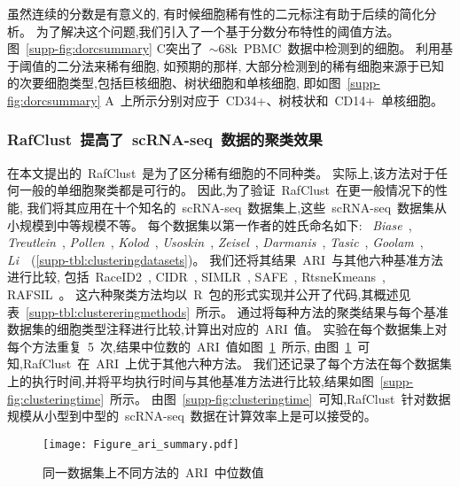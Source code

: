 虽然连续的分数是有意义的,
有时候细胞稀有性的二元标注有助于后续的简化分析。
为了解决这个问题,我们引入了一个基于分数分布特性的阈值方法。
图~\ref{supp-fig:dorcsummary} C突出了~${\sim}68$k~PBMC~数据中检测到的细胞。
利用基于阈值的二分法来稀有细胞,
如预期的那样,
大部分检测到的稀有细胞来源于已知的次要细胞类型,包括巨核细胞、树状细胞和单核细胞,
即如图~\ref{supp-fig:dorcsummary} A~上所示分别对应于~CD34+、树枝状和~CD14+~单核细胞。

\subsubsection{RafClust~提高了~scRNA-seq~数据的聚类效果}

在本文提出的~RafClust~是为了区分稀有细胞的不同种类。
实际上,该方法对于任何一般的单细胞聚类都是可行的。
因此,为了验证~RafClust~在更一般情况下的性能,
我们将其应用在十个知名的~scRNA-seq~数据集上,这些~scRNA-seq~数据集从小规模到中等规模不等。
每个数据集以第一作者的姓氏命名如下: 
~\textit{Biase}~\cite{biase2014cell},
\textit{Treutlein}~\cite{treutlein2014reconstructing}, \textit{Pollen}~\cite{pollen2014low}, 
\textit{Kolod}~\cite{kolodziejczyk2015single}, \textit{Usoskin}~\cite{usoskin2015unbiased}, 
\textit{Zeisel}~\cite{zeisel2015cell}, \textit{Darmanis}~\cite{darmanis2015survey}, 
\textit{Tasic}~\cite{tasic2016adult}, 
\textit{Goolam}~\cite{goolam2016heterogeneity}, 
\textit{Li}~\cite{li2017reference}~(\ref{supp-tbl:clusteringdatasets})。
我们还将其结果~ARI~与其他六种基准方法进行比较,
包括~RaceID2~\cite{grun2016novo}, CIDR~\cite{lin2017cidr}, SIMLR~\cite{wang2018simlr}, SAFE~\cite{yang2018safe}, RtsneKmeans~\cite{hartigan1979algorithm,maaten2008visualizing,van2014accelerating}, RAFSIL~\cite{pouyan2018random}。
这六种聚类方法均以~R~包的形式实现并公开了代码,其概述见表~\ref{supp-tbl:clustereringmethods}~所示。
通过将每种方法的聚类结果与每个基准数据集的细胞类型注释进行比较,计算出对应的~ARI~值。 
实验在每个数据集上对每个方法重复~5~次,结果中位数的~ARI~值如图~\ref{fig:rafari}~所示,
由图~\ref{fig:rafari}~可知,RafClust~在~ARI~上优于其他六种方法。
我们还记录了每个方法在每个数据集上的执行时间,并将平均执行时间与其他基准方法进行比较,结果如图~\ref{supp-fig:clusteringtime}~所示。
由图~\ref{supp-fig:clusteringtime}~可知,RafClust~针对数据规模从小型到中型的~scRNA-seq~数据在计算效率上是可以接受的。

\begin{figure}[!htbp]
    \centering
    \texttt{[image: Figure\_ari\_summary.pdf]}
    \caption{
    同一数据集上不同方法的~ARI~中位数值
    }
    \label{fig:rafari}
\end{figure}


